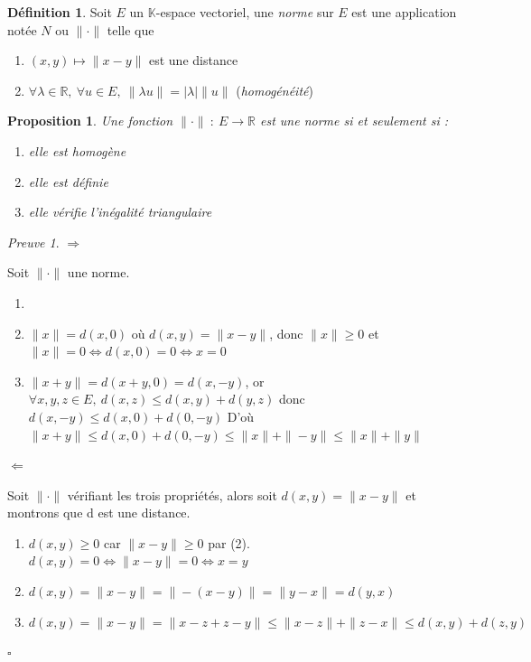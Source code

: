 \documentclass[]{article}
\newtheorem{myproposition}{Proposition}
\theoremstyle{remark}
\newtheorem{myproof}{Preuve}
\theoremstyle{definition}
\newtheorem{mydef}{Définition}
\newcommand{\cqfd}{
	\hfill$\square$
}
\begin{document}
\begin{mydef}
	Soit $E$ un $\mathbb{K}$-espace vectoriel, une \textit{norme} sur $E$ est une application notée $N$ ou $\|\cdot\|$ telle que
	\begin{enumerate}
		\item $(x, y) \longmapsto \|x - y\|$ est une distance
		\item $\forall \lambda \in \mathbb{R}, ~ \forall u \in E, ~ \|\lambda u\| = |\lambda|\|u\|$ (\textit{homogénéité})
	\end{enumerate}
\end{mydef}

\begin{myproposition}
	Une fonction $\|\cdot\| ~ : ~ E \longrightarrow \mathbb{R}$ est une norme si et seulement si :
	\begin{enumerate}
		\item elle est homogène
		\item elle est définie
		\item elle vérifie l'inégalité triangulaire
	\end{enumerate}
\end{myproposition}

\begin{myproof}
	\leavevmode
	
	{\boldmath $\Longrightarrow$}
	
	Soit $\|\cdot\|$ une norme.
	\begin{enumerate}
		\item \checkmark
		\item $\|x\|=d(x, 0)$ où $d(x,y)=\|x-y\|$, donc $\|x\| \geqslant 0$ et $\|x\|=0 \Longleftrightarrow d(x, 0)=0 \Longleftrightarrow x=0$
		\item $\|x+y\| = d(x+y, 0) = d(x, -y)$, or $\forall x, y, z \in E, ~ d(x, z) \leqslant d(x, y) + d(y, z)$ donc $d(x, -y) \leqslant d(x, 0) + d(0, -y)$
		D'où $\|x+y\| \leqslant d(x, 0) + d(0, -y) \leqslant \|x\| + \|-y\| \leqslant \|x\| + \|y\|$
	\end{enumerate}
	
	{\boldmath $\Longleftarrow$}
	
	Soit $\| \cdot \|$ vérifiant les trois propriétés, alors soit $d(x, y)=\|x-y\|$ et montrons que d est une distance.
	
	\begin{enumerate}
		\item $d(x, y) \geqslant 0$ car $\|x-y\| \geqslant 0$ par (2).
		$d(x, y) = 0 \Longleftrightarrow \|x-y\| = 0 \Longleftrightarrow x = y$
		
		\item $d(x, y) = \|x-y\|=\|-(x-y)\| = \|y-x\|=d(y, x)$
		
		\item $d(x, y) = \|x-y\| = \|x-z + z - y\| \leqslant \|x-z\| +\|z-x\| \leqslant d(x, y) + d(z, y)$
 	\end{enumerate}
 	\cqfd
\end{myproof}
\end{document}
